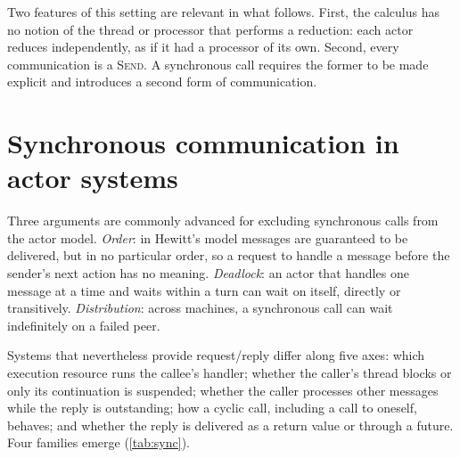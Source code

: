 \documentclass[11pt]{article}
\theoremstyle{definition}
\theoremstyle{remark}
\begin{document}
Two features of this setting are relevant in what follows. First, the calculus has no
notion of the thread or processor that performs a reduction: each actor reduces
independently, as if it had a processor of its own. Second, every communication is a
\textsc{Send}. A synchronous call requires the former to be made explicit and introduces
a second form of communication.

\section{Synchronous communication in actor systems}
\label{sec:related-sync}

Three arguments are commonly advanced for excluding synchronous calls from the actor
model. \emph{Order}: in Hewitt's model messages are guaranteed to be delivered, but in
no particular order, so a request to handle a message before the sender's next action
has no meaning. \emph{Deadlock}: an actor that handles one message at a time and waits
within a turn can wait on itself, directly or transitively. \emph{Distribution}: across
machines, a synchronous call can wait indefinitely on a failed peer.

Systems that nevertheless provide request/reply differ along five axes: which execution
resource runs the callee's handler; whether the caller's thread blocks or only its
continuation is suspended; whether the caller processes other messages while the reply is
outstanding; how a cyclic call, including a call to oneself, behaves; and whether the
reply is delivered as a return value or through a future. Four families emerge
(\cref{tab:sync}).
\end{document}
